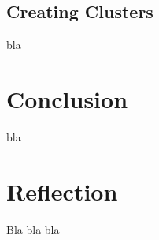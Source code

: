 \documentclass[a4paper]{article}
\begin{document}
\subsection{Creating Clusters}

bla


\section{Conclusion}
\label{sec:conclusion}
bla


\section{Reflection}
\label{sec:reflection}
Bla bla bla






\end{document}
